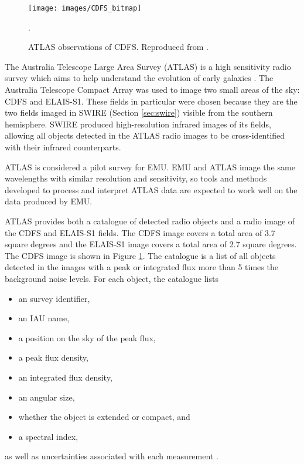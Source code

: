             \begin{figure}
                \centering
                \texttt{[image: images/CDFS\_bitmap]}
                \caption{ATLAS observations of CDFS.
                    Reproduced from \citet{franzen15}.}.
                \label{fig:cdfs}
            \end{figure}

            The Australia Telescope Large Area Survey (ATLAS) is a high
            sensitivity radio survey which aims to help understand the evolution
            of early galaxies \citep{norris06}. The Australia Telescope Compact
            Array was used to image two small areas of the sky: CDFS and
            ELAIS-S1. These fields in particular were chosen because they are
            the two fields imaged in SWIRE (Section \ref{sec:swire}) visible from
            the southern hemisphere. SWIRE produced high-resolution infrared
            images of its fields, allowing all objects detected in the ATLAS
            radio images to be cross-identified with their infrared
            counterparts.

            ATLAS is considered a pilot survey for EMU. EMU and ATLAS image the
            same wavelengths with similar resolution and sensitivity, so tools
            and methods developed to process and interpret ATLAS data are
            expected to work well on the data produced by EMU.

            ATLAS provides both a catalogue of detected radio objects and a
            radio image of the CDFS and ELAIS-S1 fields. The CDFS image covers a
            total area of 3.7 square degrees and the ELAIS-S1 image covers a
            total area of 2.7 square degrees. The CDFS image is shown in Figure
            \ref{fig:cdfs}. The catalogue is a list of all objects detected in
            the images with a peak or integrated flux more than 5 times the
            background noise levels. For each object, the catalogue lists
            \begin{itemize}
                \setlength\itemsep{0 pt}
                \item an survey identifier,
                \item an IAU name,
                \item a position on the sky of the peak flux,
                \item a peak flux density,
                \item an integrated flux density,
                \item an angular size,
                \item whether the object is extended or compact, and
                \item a spectral index,
            \end{itemize}
            as well as uncertainties associated with each measurement
            \citep{franzen15}.

